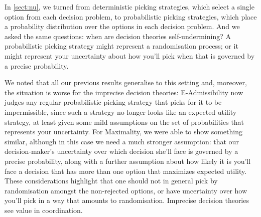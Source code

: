 \documentclass[a4paper]{article}
\newcommand\EU{\mathrm{EU}}
\newcommand{\todoold}[2][]{\todo[backgroundcolor=white,bordercolor=orange!10,linecolor=gray!10, #1,caption={},textcolor=gray]{Pre-rev: #2}}
\newenvironment{CCM rewritten}
{\begingroup\color{blue}} %
{\endgroup}              %
\begin{document}

In \cref{sect:nu}, we turned from deterministic picking strategies, which select a single option from each decision problem, to probabilistic picking strategies, which place a probability distribution over the options in each decision problem. And we asked the same questions: when are decision theories self-undermining? A probabilistic picking strategy might represent a randomisation process; or it might represent your uncertainty about how you'll pick when that is governed by a precise probability.%

We noted that all our previous results generalise to this setting and, moreover, the situation is worse for the imprecise decision theories:
 E-Admissibility now judges any regular probabilistic picking strategy that picks for it to be impermissible, since such a strategy no longer looks like an expected utility strategy, at least given some mild assumptions on the set of probabilities that represents your uncertainty. 
For Maximality, we were able to show something similar, although in this case we need a much stronger assumption: that our decision-maker's uncertainty over which decision she'll face is governed by a precise probability, along with a further assumption about how likely it is you'll face a decision that has more than one option that maximizes expected utility. %
	These considerations highlight that one should not in general pick by randomisation amongst the non-rejected options, or have uncertainty over how you'll pick in a way that amounts to randomisation. Imprecise decision theories see value in coordination. %
\end{document}
